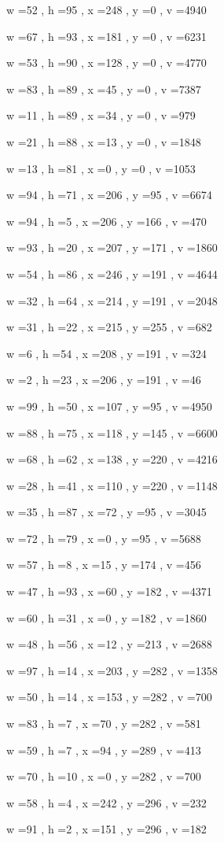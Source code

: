\documentclass[11pt]{article}
\begin{document}
w =52 , h =95 , x =248 , y =0 , v =4940
\par
w =67 , h =93 , x =181 , y =0 , v =6231
\par
w =53 , h =90 , x =128 , y =0 , v =4770
\par
w =83 , h =89 , x =45 , y =0 , v =7387
\par
w =11 , h =89 , x =34 , y =0 , v =979
\par
w =21 , h =88 , x =13 , y =0 , v =1848
\par
w =13 , h =81 , x =0 , y =0 , v =1053
\par
w =94 , h =71 , x =206 , y =95 , v =6674
\par
w =94 , h =5 , x =206 , y =166 , v =470
\par
w =93 , h =20 , x =207 , y =171 , v =1860
\par
w =54 , h =86 , x =246 , y =191 , v =4644
\par
w =32 , h =64 , x =214 , y =191 , v =2048
\par
w =31 , h =22 , x =215 , y =255 , v =682
\par
w =6 , h =54 , x =208 , y =191 , v =324
\par
w =2 , h =23 , x =206 , y =191 , v =46
\par
w =99 , h =50 , x =107 , y =95 , v =4950
\par
w =88 , h =75 , x =118 , y =145 , v =6600
\par
w =68 , h =62 , x =138 , y =220 , v =4216
\par
w =28 , h =41 , x =110 , y =220 , v =1148
\par
w =35 , h =87 , x =72 , y =95 , v =3045
\par
w =72 , h =79 , x =0 , y =95 , v =5688
\par
w =57 , h =8 , x =15 , y =174 , v =456
\par
w =47 , h =93 , x =60 , y =182 , v =4371
\par
w =60 , h =31 , x =0 , y =182 , v =1860
\par
w =48 , h =56 , x =12 , y =213 , v =2688
\par
w =97 , h =14 , x =203 , y =282 , v =1358
\par
w =50 , h =14 , x =153 , y =282 , v =700
\par
w =83 , h =7 , x =70 , y =282 , v =581
\par
w =59 , h =7 , x =94 , y =289 , v =413
\par
w =70 , h =10 , x =0 , y =282 , v =700
\par
w =58 , h =4 , x =242 , y =296 , v =232
\par
w =91 , h =2 , x =151 , y =296 , v =182
\par
\newpage
\end{document}
